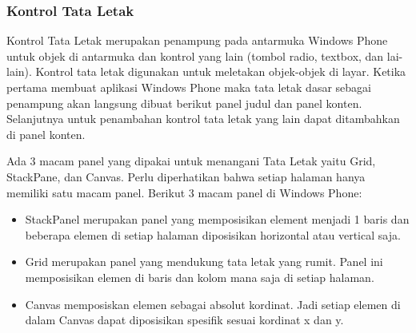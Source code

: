 \subsubsection{Kontrol Tata Letak}
\label{subsubsec:Kontrol Tata Letak}
\hspace{0.5cm} Kontrol Tata Letak merupakan penampung pada antarmuka Windows Phone untuk objek di antarmuka dan kontrol yang lain (tombol radio, textbox, dan lai-lain). Kontrol tata letak digunakan untuk meletakan objek-objek di layar. Ketika pertama membuat aplikasi Windows Phone maka tata letak dasar sebagai penampung akan langsung dibuat berikut panel judul dan panel konten. Selanjutnya untuk penambahan kontrol tata letak yang lain dapat ditambahkan di panel konten.


\hspace{0.5cm} Ada 3 macam panel yang dipakai untuk menangani Tata Letak yaitu Grid, StackPane, dan Canvas. Perlu diperhatikan bahwa setiap halaman hanya memiliki satu macam panel. Berikut 3 macam panel di Windows Phone:

\begin{itemize}
	\item StackPanel merupakan panel yang memposisikan element menjadi 1 baris dan beberapa elemen di setiap halaman diposisikan horizontal atau vertical saja.
	\item Grid merupakan panel yang mendukung tata letak yang rumit. Panel ini memposisikan elemen di baris dan kolom mana saja di setiap halaman.
	\item Canvas memposiskan elemen sebagai absolut kordinat. Jadi setiap elemen di dalam Canvas dapat diposisikan spesifik sesuai kordinat x dan y.
\end{itemize}
	
